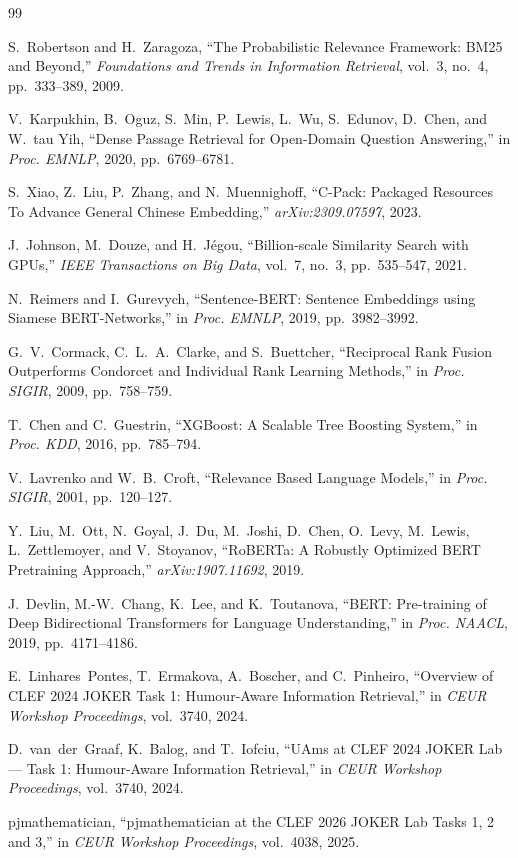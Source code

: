 \begin{thebibliography}{99}

S.~Robertson and H.~Zaragoza,
``The Probabilistic Relevance Framework: BM25 and Beyond,''
\textit{Foundations and Trends in Information Retrieval}, vol.~3, no.~4,
pp.~333--389, 2009.

V.~Karpukhin, B.~Oguz, S.~Min, P.~Lewis, L.~Wu, S.~Edunov, D.~Chen,
and W.~tau Yih,
``Dense Passage Retrieval for Open-Domain Question Answering,''
in \textit{Proc. EMNLP}, 2020, pp.~6769--6781.

S.~Xiao, Z.~Liu, P.~Zhang, and N.~Muennighoff,
``C-Pack: Packaged Resources To Advance General Chinese Embedding,''
\textit{arXiv:2309.07597}, 2023.

J.~Johnson, M.~Douze, and H.~J\'egou,
``Billion-scale Similarity Search with GPUs,''
\textit{IEEE Transactions on Big Data}, vol.~7, no.~3, pp.~535--547, 2021.

N.~Reimers and I.~Gurevych,
``Sentence-BERT: Sentence Embeddings using Siamese BERT-Networks,''
in \textit{Proc. EMNLP}, 2019, pp.~3982--3992.

G.~V.~Cormack, C.~L.~A.~Clarke, and S.~Buettcher,
``Reciprocal Rank Fusion Outperforms Condorcet and Individual Rank Learning
Methods,''
in \textit{Proc. SIGIR}, 2009, pp.~758--759.

T.~Chen and C.~Guestrin,
``XGBoost: A Scalable Tree Boosting System,''
in \textit{Proc. KDD}, 2016, pp.~785--794.

V.~Lavrenko and W.~B.~Croft,
``Relevance Based Language Models,''
in \textit{Proc. SIGIR}, 2001, pp.~120--127.

Y.~Liu, M.~Ott, N.~Goyal, J.~Du, M.~Joshi, D.~Chen, O.~Levy,
M.~Lewis, L.~Zettlemoyer, and V.~Stoyanov,
``RoBERTa: A Robustly Optimized BERT Pretraining Approach,''
\textit{arXiv:1907.11692}, 2019.

J.~Devlin, M.-W.~Chang, K.~Lee, and K.~Toutanova,
``BERT: Pre-training of Deep Bidirectional Transformers for Language
Understanding,''
in \textit{Proc. NAACL}, 2019, pp.~4171--4186.

E.~Linhares~Pontes, T.~Ermakova, A.~Boscher, and C.~Pinheiro,
``Overview of CLEF 2024 JOKER Task 1: Humour-Aware Information Retrieval,''
in \textit{CEUR Workshop Proceedings}, vol.~3740, 2024.

D.~van~der~Graaf, K.~Balog, and T.~Iofciu,
``UAms at CLEF 2024 JOKER Lab --- Task 1: Humour-Aware Information
Retrieval,''
in \textit{CEUR Workshop Proceedings}, vol.~3740, 2024.

pjmathematician,
``pjmathematician at the CLEF 2026 JOKER Lab Tasks 1, 2 and 3,''
in \textit{CEUR Workshop Proceedings}, vol.~4038, 2025.

\end{thebibliography}
